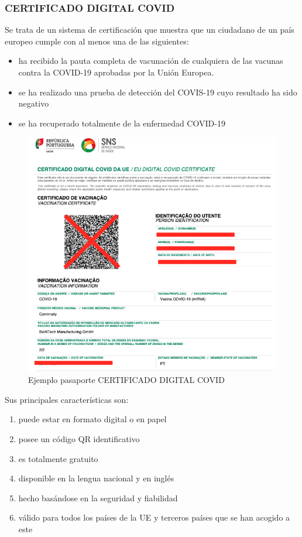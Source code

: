 \documentclass[11pt,a4paper,spanish]{article}
\begin{document}
\subsubsection{CERTIFICADO DIGITAL COVID}
Se trata de un sistema de certificación que muestra que un ciudadano de un país europeo cumple con al menos una de las siguientes:

\begin{itemize}
\item ha recibido la pauta completa de vacunación de cualquiera de las vacunas contra la COVID-19 aprobadas por la Unión Europea.
\item se ha realizado una prueba de detección del COVIS-19 cuyo resultado ha sido negativo
\item se ha recuperado totalmente de la enfermedad COVID-19
\end{itemize}

\begin{figure}[h!]
  \centering
  \includegraphics[width=0.65\linewidth]{1.png} 
  \caption{Ejemplo pasaporte CERTIFICADO DIGITAL COVID}
\end{figure}
Sus principales características son:

\begin{enumerate}
\item puede estar en formato digital o en papel
\item posee un código QR identificativo
\item es totalmente gratuito
\item disponible en la lengua nacional y en inglés
\item hecho basándose en la seguridad y fiabilidad 
\item válido para todos los países de la UE y terceros países que se han acogido a este
\end{enumerate} 
\end{document}
